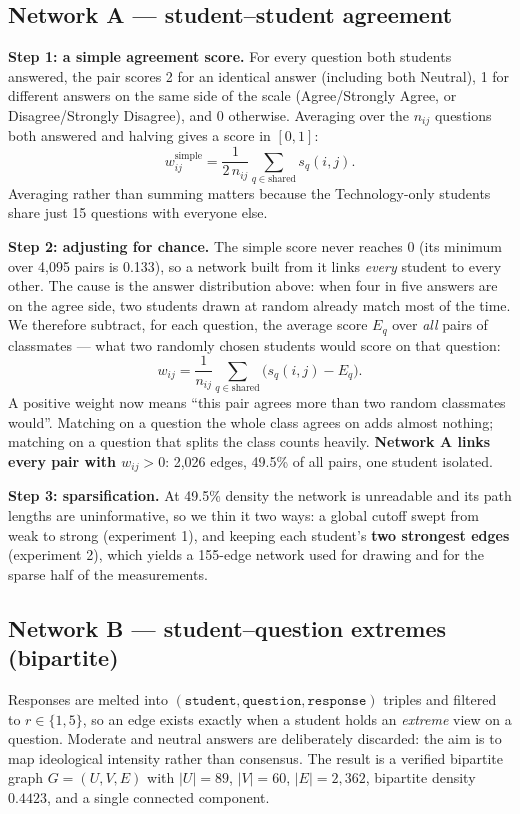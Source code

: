 \documentclass[11pt, a4paper]{article}
\begin{document}
\subsection{Network A --- student--student agreement}

\textbf{Step 1: a simple agreement score.} For every question both students answered, the pair scores 2 for an
identical answer (including both Neutral), 1 for different answers on the same side of the scale
(Agree/Strongly Agree, or Disagree/Strongly Disagree), and 0 otherwise. Averaging over the $n_{ij}$ questions
both answered and halving gives a score in $[0,1]$:
$$w^{\text{simple}}_{ij} = \frac{1}{2\,n_{ij}} \sum_{q \in \text{shared}} s_q(i,j).$$
Averaging rather than summing matters because the Technology-only students share just 15 questions with
everyone else.

\textbf{Step 2: adjusting for chance.} The simple score never reaches 0 (its minimum over 4{,}095 pairs is
0.133), so a network built from it links \emph{every} student to every other. The cause is the answer
distribution above: when four in five answers are on the agree side, two students drawn at random already match
most of the time. We therefore subtract, for each question, the average score $E_q$ over \emph{all} pairs of
classmates --- what two randomly chosen students would score on that question:
$$w_{ij} = \frac{1}{n_{ij}} \sum_{q \in \text{shared}} \bigl(s_q(i,j) - E_q\bigr).$$
A positive weight now means ``this pair agrees more than two random classmates would''. Matching on a question
the whole class agrees on adds almost nothing; matching on a question that splits the class counts heavily.
\textbf{Network A links every pair with $w_{ij} > 0$}: 2{,}026 edges, 49.5\% of all pairs, one student isolated.

\textbf{Step 3: sparsification.} At 49.5\% density the network is unreadable and its path lengths are
uninformative, so we thin it two ways: a global cutoff swept from weak to strong (experiment 1), and keeping
each student's \textbf{two strongest edges} (experiment 2), which yields a 155-edge network used for drawing and
for the sparse half of the measurements.

\subsection{Network B --- student--question extremes (bipartite)}

Responses are melted into $(\texttt{student}, \texttt{question}, \texttt{response})$ triples and filtered to
$r \in \{1,5\}$, so an edge exists exactly when a student holds an \emph{extreme} view on a question. Moderate
and neutral answers are deliberately discarded: the aim is to map ideological intensity rather than consensus.
The result is a verified bipartite graph $G = (U,V,E)$ with $|U| = 89$, $|V| = 60$, $|E| = 2{,}362$, bipartite
density $0.4423$, and a single connected component.
\end{document}
